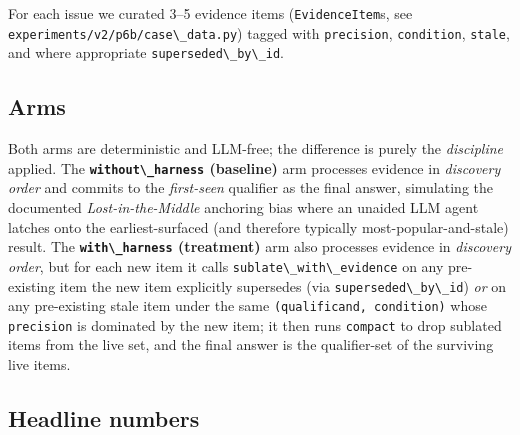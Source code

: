 For each issue we curated 3--5 evidence items (\passthrough{\lstinline!EvidenceItem!}s, see \passthrough{\lstinline!experiments/v2/p6b/case\_data.py!}) tagged with \passthrough{\lstinline!precision!}, \passthrough{\lstinline!condition!}, \passthrough{\lstinline!stale!}, and where appropriate \passthrough{\lstinline!superseded\_by\_id!}.

\subsection{Arms}\label{arms}

Both arms are deterministic and LLM-free; the difference is purely the \emph{discipline} applied. The \textbf{\passthrough{\lstinline!without\_harness!} (baseline)} arm processes evidence in \emph{discovery order} and commits to the \emph{first-seen} qualifier as the final answer, simulating the documented \emph{Lost-in-the-Middle} anchoring bias \citep{liu2023lostmiddle} where an unaided LLM agent latches onto the earliest-surfaced (and therefore typically most-popular-and-stale) result. The \textbf{\passthrough{\lstinline!with\_harness!} (treatment)} arm also processes evidence in \emph{discovery order}, but for each new item it calls \passthrough{\lstinline!sublate\_with\_evidence!} on any pre-existing item the new item explicitly supersedes (via \passthrough{\lstinline!superseded\_by\_id!}) \emph{or} on any pre-existing stale item under the same \passthrough{\lstinline!(qualificand, condition)!} whose \passthrough{\lstinline!precision!} is dominated by the new item; it then runs \passthrough{\lstinline!compact!} to drop sublated items from the live set, and the final answer is the qualifier-set of the surviving live items.

\subsection{Headline numbers}\label{headline-numbers}

